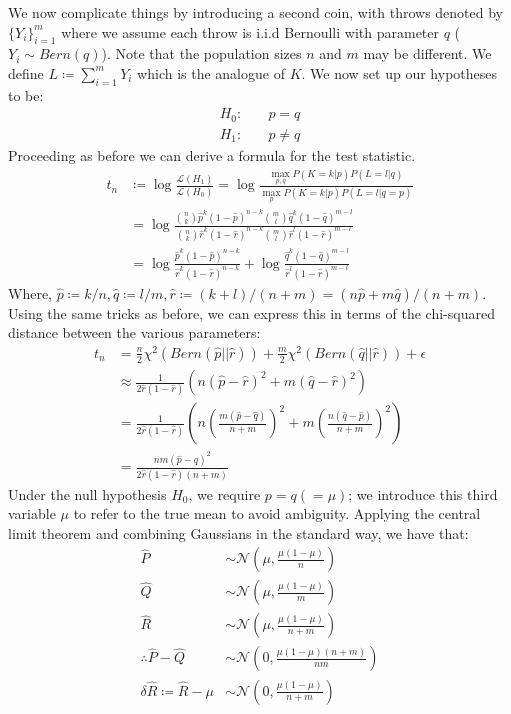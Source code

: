 \documentclass[]{article}
\newcommand{\Gaussian}{\mathcal{N}}
\newcommand{\lik}{\mathcal{L}}
\begin{document}
We now complicate things by introducing a second coin, with throws denoted by $\{Y_i\}_{i=1}^{m}$ where we assume each throw is i.i.d Bernoulli with parameter $q$ ($Y_i \sim Bern(q)$). Note that the population sizes $n$ and $m$ may be different. We define $L \coloneqq \sum_{i=1}^{m} Y_i$ which is the analogue of $K$. We now set up our hypotheses to be:
%
\begin{align*}
H_0:& \quad p = q \\
H_1:& \quad p \neq q
\end{align*}
%
Proceeding as before we can derive a formula for the test statistic.
%
\begin{align*}
t_n &\coloneqq \log \frac{\lik(H_1)}{\lik(H_0)}
= \log \frac{\max_{p,q} P(K=k|p) P(L=l|q)}{\max_p P(K=k|p) P(L=l|q=p)} \\
&= \log \frac
{\binom{n}{k} \hat{p}^k (1 - \hat{p})^{n-k} \binom{m}{l} \hat{q}^k (1 - \hat{q})^{m-l}}
{\binom{n}{k} \hat{r}^k (1 - \hat{r})^{n-k} \binom{m}{l} \hat{r}^l (1 - \hat{r})^{m-l}} \\
&= \log \frac
{ \hat{p}^k (1 - \hat{p})^{n-k}}
{ \hat{r}^k (1 - \hat{r})^{n-k}}
+ \log \frac{\hat{q}^k (1 - \hat{q})^{m-l}}{ \hat{r}^l (1 - \hat{r})^{m-l}}
\end{align*} 
%
Where, $\hat{p} \coloneqq k/n, \hat{q} \coloneqq l/m, \hat{r} \coloneqq (k+l)/(n+m) = (n\hat{p} + m\hat{q})/(n+m)$. Using the same tricks as before, we can express this in terms of the chi-squared distance between the various parameters:
%
\begin{align*}
t_n &= \frac{n}{2} \chi^2\left(Bern(\hat{p}||\hat{r})\right)
+ \frac{m}{2} \chi^2\left(Bern(\hat{q}||\hat{r})\right)
+ \epsilon \\
&\approx \frac{1}{2\hat{r}(1-\hat{r})} \left(
n(\hat{p} - \hat{r})^2 + m(\hat{q} - \hat{r})^2
\right) \\
&= \frac{1}{2\hat{r}(1-\hat{r})} \left(
n\left( \frac{m(\hat{p} - \hat{q})}{n+m}\right)^2 + 
m\left( \frac{n(\hat{q} - \hat{p})}{n+m}\right)^2
\right) \\
&= \frac{nm(\hat{p} - \hat{q})^2}{2\hat{r}(1-\hat{r})(n+m)}
\end{align*}
%
Under the null hypothesis $H_0$, we require $p=q(=\mu)$; we introduce this third variable $\mu$ to refer to the true mean to avoid ambiguity. Applying the central limit theorem and combining Gaussians in the standard way, we have that:
%
\begin{align*}
\hat{P} &\sim \Gaussian \left( \mu, \frac{\mu(1-\mu)}{n} \right) \\
\hat{Q} &\sim \Gaussian \left(\mu, \frac{\mu(1-\mu)}{m} \right) \\
\hat{R} &\sim \Gaussian \left(\mu, \frac{\mu(1-\mu)}{n+m} \right) \\
\therefore \hat{P} - \hat{Q} &\sim \Gaussian \left(0, \frac{\mu(1-\mu)(n+m)}{nm} \right) \\
\delta \hat{R} \coloneqq \hat{R} - \mu &\sim \Gaussian \left( 0, \frac{\mu(1-\mu)}{n+m} \right)
\end{align*}
%
\end{document}

